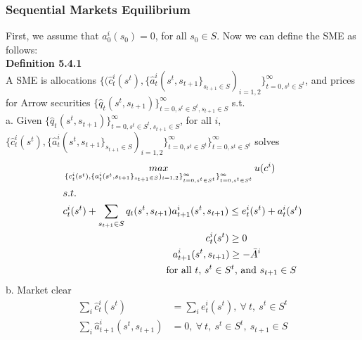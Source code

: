 \documentclass{article}
\begin{document}
\subsubsection{Sequential Markets Equilibrium}
First, we assume that $a^i_0(s_0)= 0$, for all $s_0 \in S$. Now we can define the SME as follows:\\
\textbf{Definition 5.4.1}\\
A SME is allocations $\{(\hat{c}^i_t(s^t), \{\hat{a}^i_t(s^t, s_{t+1}\}_{s_{t+1} \in S})_{i = 1, 2}\}^\infty_{t = 0, s^t \in S^t}$, and prices for Arrow securities $\{\hat{q}_t(s^t, s_{t+1})\}^\infty_{t=0, s^t \in S^t, s_{t+1} \in S}$ s.t.\\
\indent a. Given $\{\hat{q}_t(s^t, s_{t+1})\}^\infty_{t=0, s^t \in S^t, s_{t+1} \in S}$, for all $i$, $\{\hat{c}^i_t(s^t), \{\hat{a}^i_t(s^t, s_{t+1}\}_{s_{t+1} \in S})_{i = 1, 2}\}^\infty_{t = 0, s^t \in S^t}\}^\infty_{t = 0, s^t \in S^t}$ solves
\begin{align*}
	&\mathop{max}\limits_{\{c^i_t(s^t), \{a^i_t(s^t, s_{t+1}\}_{s_{t+1} \in S})_{i = 1, 2}\}^\infty_{t = 0, s^t \in S^t}\}^\infty_{t = 0, s^t \in S^t}} u(c^i)\\
	&s.t.\\
	& c^i_t(s^t) + \sum\limits_{s_{t+1} \in S} q_t(s^t, s_{t+1}) a^i_{t+1}(s^t, s_{t+1}) \leq e^i_t(s^t) + a^i_t(s^t)\\
	&\indent\indent\indent\indent\indent\indent\indent\indent\indent\ \ \ c^i_t(s^t) \geq 0\\
	&\indent\indent\indent\indent\indent\indent\indent\ \ a^i_{t+1}(s^t, s_{t+1}) \geq -\bar{A}^i\\
	&\indent\indent\indent\indent\indent\indent\indent \text{for all $t$, $s^t \in S^t$, and $s_{t+1} \in S$}
\end{align*}
\indent b. Market clear
\begin{align*}
	\sum\limits_i \hat{c}^i_t(s^t) &= \sum\limits_i e^i_t(s^t),\ \forall\ t,\ s^t \in S^t\\
	\sum\limits_i \hat{a}^i_{t+1}(s^t, s_{t+1}) &= 0,\ \forall\ t,\ s^t \in S^t,\ s_{t+1} \in S\\
\end{align*}
\end{document}

